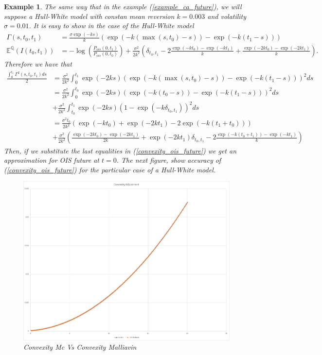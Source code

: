 \documentclass[a4paper,10pt]{article}
\newtheorem{example}[theorem]{Example}
\newcommand{\1}{\mathbf{1}}
\begin{document}
\begin{example}\label{example_convexity_hw_ois}
The same way that in the example (\ref{example_ca_future}), we will suppose a Hull-White model with constan mean reversion $k=0.003$ and volatility $\sigma=0.01$. It is easy to show in the case of the Hull-White model
\begin{align*}
\Gamma(s,t_0,t_1) &= \frac{\sigma \exp(-ks)}{k}\left(\exp(-k(\max(s,t_0) - s)) - \exp(-k(t_1-s))\right)\\
\mathbb{E}^{\mathbb{Q}}\left(I(t_0,t_1)\right)&=-\log\left(\frac{P_{ois}(0,t_1)}{P_{ois}(0,t_0)}\right) + \frac{\sigma^{2}}{2k^{2}}\left(\delta_{t_0,t_1} - 2 \frac{\exp(-kt_0) - \exp(-kt_1)}{k} + \frac{\exp(-2kt_0) - \exp(-2kt_1)}{k}  \right).
\end{align*}
Therefore we have that
\begin{align*}
\frac{\int_{0}^{t_1} \Gamma^{2}(s,t_0,t_1) ds}{2} &= \frac{\sigma^{2}}{2k^{2}} \int_{0}^{t_1}  \exp(-2ks)\left(\exp(-k(\max(s,t_0) - s)) - \exp(-k(t_1 - s))\right)^{2} ds \\
&= \frac{\sigma^{2}}{2k^{2}} \int_{0}^{t_0} \exp(-2ks)\left(\exp(-k(t_0 - s)) - \exp(-k(t_1 - s))\right)^{2} ds\\
&+ \frac{\sigma^{2}}{2k^{2}} \int_{t_0}^{t_1} \exp(-2ks)\left(1 - \exp(-k\delta_{t_0,t_1})\right)^{2} ds\\
&= \frac{\sigma^{2}t_0}{2k^{2}} \left( \exp(-kt_0) + \exp(-2kt_1) - 2 \exp(-k(t_1+t_0)) \right)\\  
&+ \frac{\sigma^{2}}{2k^{2}} \left(\frac{\exp(-2kt_0) - \exp(-2kt_1)}{2k} + \exp(-2kt_1)\delta_{t_0,t_1} - 2\frac{\exp(-k(t_0 + t_1)) - \exp(-kt_1)}{k}  \right)
\end{align*}
Then, if we substitute the last equalities in (\ref{convexity_ois_future}) we get an approximation for OIS future at $t=0$. The next figure, show accuracy of (\ref{convexity_ois_future}) for the particular case of a Hull-White model.

\begin{figure}[h]
	\begin{center}
		\includegraphics[scale=0.2]{Figures/convexity_ois.jpg}
		\caption{Convexity Mc Vs Convexity Malliavin}
	\end{center}
\end{figure} 


\end{example}
\end{document}
